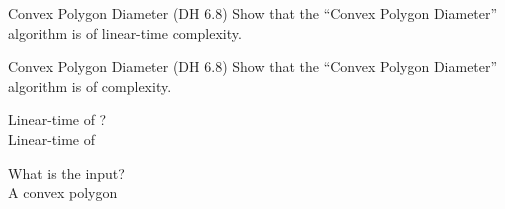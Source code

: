 
\begin{frame}{}
  \begin{exampleblock}{Convex Polygon Diameter (DH $6.8$)}
    Show that the ``Convex Polygon Diameter'' algorithm is of linear-time complexity.
  \end{exampleblock}

  \pause
  \vspace{0.30cm}
\end{frame}

\begin{frame}{}
  \begin{exampleblock}{Convex Polygon Diameter (DH $6.8$)}
    Show that the ``Convex Polygon Diameter'' algorithm is of  complexity.
  \end{exampleblock}

  \begin{center}
     Linear-time of ? \\[5pt] \pause
     Linear-time of  \\[12pt] \pause

     What is the input? \\[5pt] \pause
     A convex polygon  \\[12pt]

  \end{center}

\end{frame}

\begin{frame}{}
  \centerline{}
  \vspace{0.30cm}
\end{frame}

